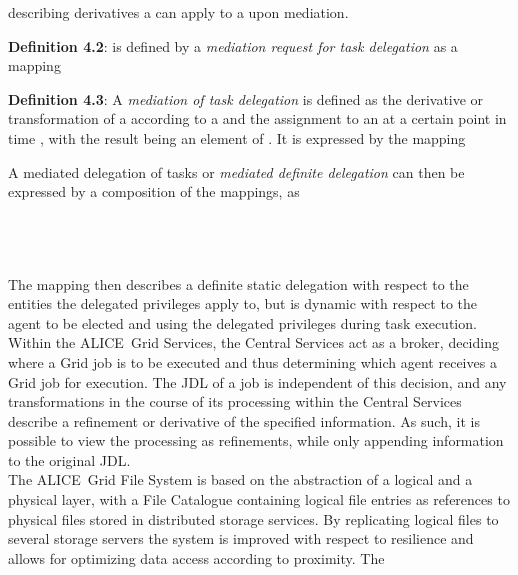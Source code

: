 \documentclass[10pt]{iopart}
\newcommand{\alice}{ALICE}
\begin{document}
describing derivatives a  can apply to a  upon mediation.\\
\par
\begingroup
\leftskip=0.4cm \noindent
\textbf{Definition 4.2}:  is defined by 
a \textit{mediation request for task delegation} as a mapping
\par
\endgroup\noindent
\begin{center}

\end{center}
\par
\begingroup
\leftskip=0.4cm \noindent
\textbf{Definition 4.3}: A \textit{mediation of task delegation} is defined as
the derivative or transformation of a  according to a 
and the assignment to an  at a certain point in time ,
with the result being an element of . It is expressed by the mapping
\par
\endgroup\noindent
\begin{center}

\end{center}
A mediated delegation of tasks or \textit{mediated definite delegation}
can then be expressed by a composition of the mappings, as \\\\
\centerline{}\\\\
The mapping  then describes a definite static
delegation with respect to the entities the delegated privileges apply to, but is dynamic with
respect to the agent to be elected and using the delegated privileges during
task execution.\\
Within the \alice\ Grid Services, the Central Services act as a broker,
deciding where a Grid job is to be executed and thus determining which
agent receives a Grid job for execution. The JDL of a job is independent
of this decision, and any transformations in the course of its processing within the Central Services 
describe a refinement or derivative of the specified information. As such, it is
possible to view the processing as refinements, while only appending
information to the original JDL.\\
The \alice\ Grid File System is based on the abstraction of a
logical and a physical layer, with a File Catalogue containing
logical file entries as references to physical files stored in
distributed storage services. By replicating logical files to several 
storage servers the system is
improved with respect to resilience and allows for optimizing data access
according to
proximity. The
\end{document}
